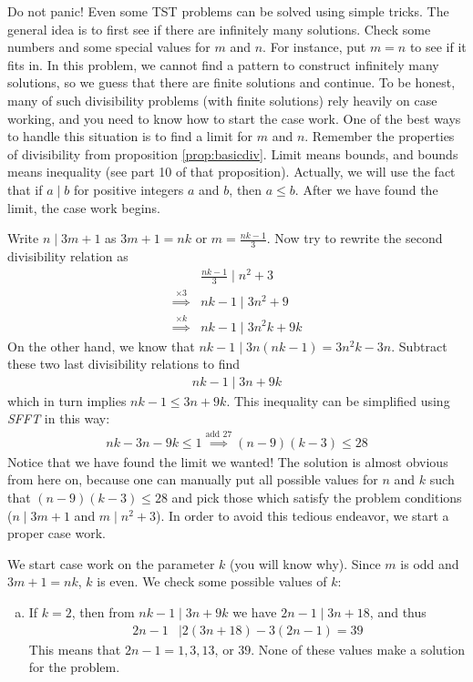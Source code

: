 \begin{solution}
	Do not panic! Even some TST problems can be solved using simple tricks. The general idea is to first see if there are infinitely many solutions. Check some numbers and some special values for $m$ and $n$. For instance, put $m=n$ to see if it fits in. In this problem, we cannot find a pattern to construct infinitely many solutions, so we guess that there are finite solutions and continue. To be honest, many of such divisibility problems (with finite solutions) rely heavily on case working, and you need to know how to start the case work. One of the best ways to handle this situation is to find a limit for $m$ and $n$. Remember the properties of divisibility from proposition \eqref{prop:basicdiv}. Limit means bounds, and bounds means inequality (see part 10 of that proposition). Actually, we will use the fact that if $a\mid b$ for positive integers $a$ and $b$, then $a \leq b$. After we have found the limit, the case work begins.

	Write $n\mid 3m+1$ as $3m+1=nk$ or $m=\frac{nk-1}{3}$. Now try to rewrite the second divisibility relation as
		\begin{align*}
			& \frac{nk-1}{3} \mid n^2 + 3 \\
			\stackrel{\times 3}{\implies} & nk-1\mid 3n^2+9 \\
			\stackrel{\times k}{\implies} & nk-1\mid 3n^2k+9k
		\end{align*}
	On the other hand, we know that $nk-1\mid 3n(nk-1)=3n^2k-3n$. Subtract these two last divisibility relations to find
		\begin{align*}
			nk-1 \mid 3n+9k
		\end{align*}
	which in turn implies $nk-1 \leq 3n+9k$. This inequality can be simplified using \textit{SFFT} in this way:
		\begin{align*}
			nk-3n-9k\leq 1 \stackrel{\text{add }27}{\implies} (n-9)(k-3) \leq 28
		\end{align*}
	Notice that we have found the limit we wanted! The solution is almost obvious from here on, because one can manually put all possible values for $n$ and $k$ such that $(n-9)(k-3) \leq 28$ and pick those which satisfy the problem conditions ($n\mid 3m+1$ and $m\mid n^2+3$). In order to avoid this tedious endeavor, we start a proper case work.

	We start case work on the parameter $k$ (you will know why). Since $m$ is odd and $3m+1=nk$, $k$ is even. We check some possible values of $k$:
		\begin{enumerate}[(a)]
			\item If $k=2$, then from $nk-1\mid 3n+9k$ we have $2n-1\mid 3n+18$, and thus
				\begin{align*}
					2n-1
						& \mid 2(3n+18)-3(2n-1)=39
				\end{align*}
		 This means that $2n-1=1, 3, 13$, or $39$. None of these values make a solution for the problem.


\end{enumerate}
\end{solution}
